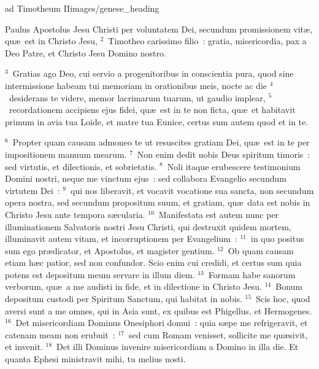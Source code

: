 {ad Timotheum II}{images/genese_heading}


\bchapter
\lettrine[lines=6,image=true,loversize=0.05,lraise=-0.03]{P}{}aulus Apostolus Jesu Christi per voluntatem Dei, secundum promissionem vit\ae , qu\ae\ est in Christo Jesu,
${}^{2}$~Timotheo carissimo filio~: gratia, misericordia, pax a Deo Patre, et Christo Jesu Domino nostro.


${}^{3}$~Gratias ago Deo, cui servio a progenitoribus in conscientia pura, quod sine intermissione habeam tui memoriam in orationibus meis, nocte ac die
${}^{4}$~desiderans te videre, memor lacrimarum tuarum, ut gaudio implear,
${}^{5}$~recordationem accipiens ejus fidei, qu\ae\ est in te non ficta, qu\ae\ et habitavit primum in avia tua Loide, et matre tua Eunice, certus sum autem quod et in te.


${}^{6}$~Propter quam causam admoneo te ut resuscites gratiam Dei, qu\ae\ est in te per impositionem manuum mearum.
${}^{7}$~Non enim dedit nobis Deus spiritum timoris~: sed virtutis, et dilectionis, et sobrietatis.
${}^{8}$~Noli itaque erubescere testimonium Domini nostri, neque me vinctum ejus~: sed collabora Evangelio secundum virtutem Dei~:
${}^{9}$~qui nos liberavit, et vocavit vocatione sua sancta, non secundum opera nostra, sed secundum propositum suum, et gratiam, qu\ae\ data est nobis in Christo Jesu ante tempora s\ae cularia.
${}^{10}$~Manifestata est autem nunc per illuminationem Salvatoris nostri Jesu Christi, qui destruxit quidem mortem, illuminavit autem vitam, et incorruptionem per Evangelium~:
${}^{11}$~in quo positus sum ego pr\ae dicator, et Apostolus, et magister gentium.
${}^{12}$~Ob quam causam etiam h\ae c patior, sed non confundor. Scio enim cui credidi, et certus sum quia potens est depositum meum servare in illum diem.
${}^{13}$~Formam habe sanorum verborum, qu\ae\ a me audisti in fide, et in dilectione in Christo Jesu.
${}^{14}$~Bonum depositum custodi per Spiritum Sanctum, qui habitat in nobis.
${}^{15}$~Scis hoc, quod aversi sunt a me omnes, qui in Asia sunt, ex quibus est Phigellus, et Hermogenes.
${}^{16}$~Det misericordiam Dominus Onesiphori domui~: quia s\ae pe me refrigeravit, et catenam meam non erubuit~:
${}^{17}$~sed cum Romam venisset, sollicite me qu\ae sivit, et invenit.
${}^{18}$~Det illi Dominus invenire misericordiam a Domino in illa die. Et quanta Ephesi ministravit mihi, tu melius nosti.

